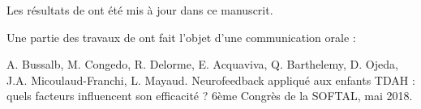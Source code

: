 Les résultats de \citet{Bussalb2019clinical} ont été mis à jour dans ce manuscrit.

Une partie des travaux de \citet{Bussalb2019clinical} ont fait l'objet d'une communication orale :

\noindent A. Bussalb, M. Congedo, R. Delorme, E. Acquaviva, Q. Barthelemy, D. Ojeda, J.A. Micoulaud-Franchi, L. Mayaud. Neurofeedback 
appliqué aux enfants TDAH : quels facteurs influencent son efficacité ? 6ème Congrès de la SOFTAL, mai 2018. 
